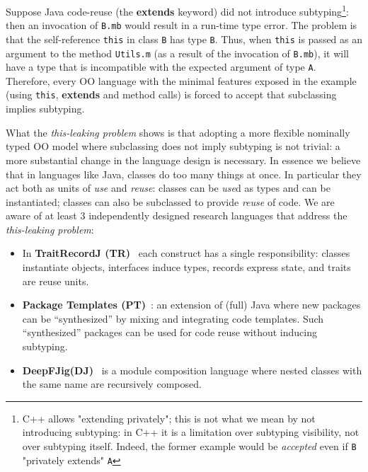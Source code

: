 Suppose Java code-reuse (the {\bf extends} keyword) did not introduce subtyping\footnote{
C++ allows "extending privately"; this is not
what we mean by not introducing subtyping: in C++ it is a limitation over
  subtyping visibility, not over subtyping itself.  Indeed, the
  former example would be \emph{accepted} even if \lstinline{B} 
  "privately extends" \lstinline{A}}: then an invocation of 
\lstinline{B.mb} would result in a run-time type error.
The problem is that the
self-reference \lstinline{this} in class \lstinline{B} has 
type \lstinline{B}. Thus, when \lstinline{this} is passed as an argument to 
the method \lstinline{Utils.m} (as a result of the invocation of
\lstinline{B.mb}), it will have a type that is incompatible with the
expected argument of type \lstinline{A}.  
Therefore, every OO language with the minimal features exposed in the example (using \lstinline{this},
{\bf extends} and method calls) is forced to accept that subclassing implies
subtyping.
  

What the \emph{this-leaking problem} shows is that adopting a more flexible
nominally typed OO model where subclassing does not imply subtyping is
not trivial: a more substantial change in the language design is
necessary.  In essence we believe that in languages like Java, classes do too many
things at once. In particular they act both as units of \emph{use} and
\emph{reuse}: classes can be \emph{use}d as types and can be instantiated;
classes can also be subclassed to provide \emph{reuse} of code.
We are aware of at least $3$ independently designed research
languages that address the \emph{this-leaking problem}:
\begin{itemize}
\item In {\bf TraitRecordJ (TR)}~\cite{Bettini:2010:ISP:1774088.1774530,BETTINI2013521,Bettini2015282}
each construct has a single responsibility: classes instantiate objects,
interfaces induce types, records express state, and traits are reuse units.
\item {\bf Package Templates (PT)}~\cite{KrogdahlMS09,DBLP:journals/taosd/AxelsenSKM12,DBLP:conf/gpce/AxelsenK12}:
an extension of (full) Java where new packages can be ``synthesized'' by mixing
and integrating code templates. 
Such ``synthesized'' packages can be used for code reuse without inducing subtyping.
\item {\bf
    DeepFJig(DJ)}~\cite{deep,servetto2014meta,fjig} is
a module composition language where nested classes with the same name are recursively composed.
\end{itemize}


